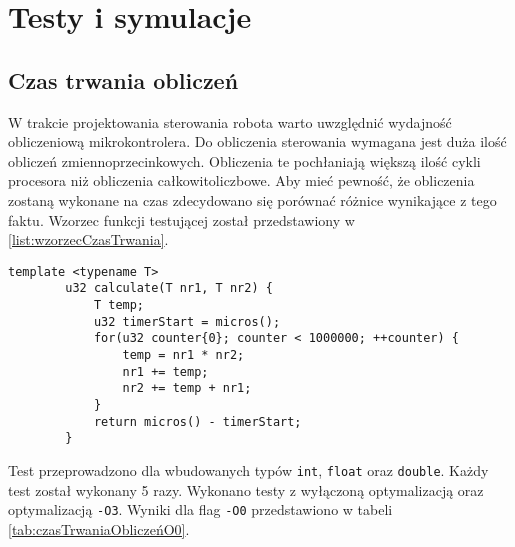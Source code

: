 \chapter{Testy i symulacje}
    \section{Czas trwania obliczeń}
        W trakcie projektowania sterowania robota warto uwzględnić wydajność obliczeniową mikrokontrolera. Do obliczenia sterowania wymagana jest duża ilość obliczeń zmiennoprzecinkowych. Obliczenia te pochłaniają większą ilość cykli procesora niż obliczenia całkowitoliczbowe. Aby mieć pewność, że obliczenia zostaną wykonane na czas zdecydowano się porównać różnice wynikające z tego faktu. Wzorzec funkcji testującej został przedstawiony w \ref{list:wzorzecCzasTrwania}.
        
        \begin{lstlisting}[label=list:wzorzecCzasTrwania ,caption=Wzorzec funkcji testującej czas wykonywania obliczeń,  basicstyle=\footnotesize\ttfamily]
        template <typename T>
        u32 calculate(T nr1, T nr2) {
            T temp;
            u32 timerStart = micros();
            for(u32 counter{0}; counter < 1000000; ++counter) {
                temp = nr1 * nr2;
                nr1 += temp;
                nr2 += temp + nr1;
            }
            return micros() - timerStart;
        }
        \end{lstlisting}
        Test przeprowadzono dla wbudowanych typów \verb+int+, \verb+float+ oraz \verb+double+. Każdy test został wykonany 5 razy. Wykonano testy z wyłączoną optymalizacją oraz optymalizacją \texttt{-O3}. Wyniki dla flag \texttt{-O0} przedstawiono w tabeli \ref{tab:czasTrwaniaObliczeńO0}.
        
